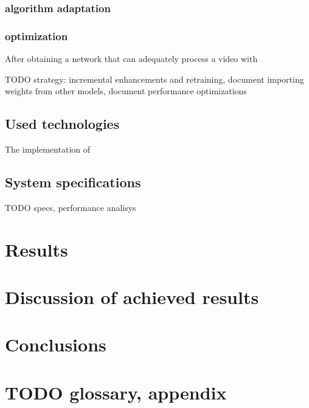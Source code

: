 \documentclass[12pt,openright,twoside,a4paper,english]{abntex2}
\begin{document}
\begin{otherlanguage}{english}
\subsection{algorithm adaptation}

\subsection{optimization}
After obtaining a network that can adequately process a video with

TODO strategy: incremental enhancements and retraining, document importing weights from other models, document performance optimizations

\section{Used technologies}
The implementation of

\section{System specifications}
TODO specs, performance analisys

\chapter{Results}

\chapter{Discussion of achieved results}

\chapter{Conclusions}

\chapter{TODO glossary, appendix}



\end{otherlanguage}
\end{document}
